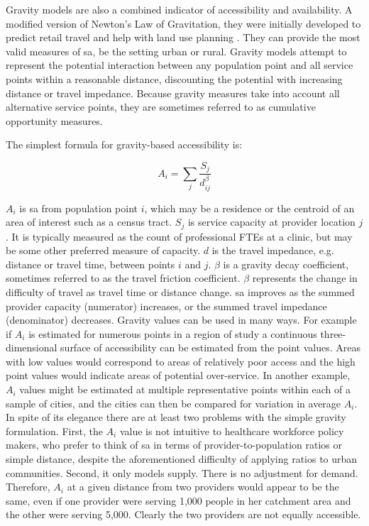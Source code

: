 Gravity models are also a combined indicator of accessibility and availability. A modified version of Newton's Law of Gravitation, they were initially developed to predict retail travel \cite{reilly_law_1931} and help with land use planning \cite{hansen_how_1959}. They can provide the most valid measures of \ac{sa}, be the setting urban or rural. Gravity models attempt to represent the potential interaction between any population point and all service points within a reasonable distance, discounting the potential with increasing distance or travel impedance. Because gravity measures take into account all alternative service points, they are sometimes referred to as cumulative opportunity measures.

The simplest formula for gravity-based accessibility is:

\begin{equation}
    A_i = \sum_j \frac{S_j}{d_{ij}^{\beta}}
\end{equation}

$A_i$ is \ac{sa} from population point $i$, which may be a residence or the centroid of an area of interest such as a census tract. $S_j$ is service capacity at provider location $j$. It is typically measured as the count of professional FTEs at a clinic, but may be some other preferred measure of capacity. $d$ is the travel impedance, e.g. distance or travel time, between points $i$ and $j$. $\beta$ is a gravity decay coefficient, sometimes referred to as the travel friction coefficient. $\beta$ represents the change in difficulty of travel as travel time or distance change. \ac{sa} improves as the summed provider capacity (numerator) increases, or the summed travel impedance (denominator) decreases. Gravity values can be used in many ways. For example if $A_i$ is estimated for numerous points in a region of study a continuous three-dimensional surface of accessibility can be estimated from the point values. Areas with low values would correspond to areas of relatively poor access and the high point values would indicate areas of potential over-service. In another example, $A_i$ values might be estimated at multiple representative points within each of a sample of cities, and the cities can then be compared for variation in average $A_i$. In spite of its elegance there are at least two problems with the simple gravity formulation. First, the $A_i$ value is not intuitive to healthcare workforce policy makers, who prefer to think of \ac{sa} in terms of provider-to-population ratios or simple distance, despite the aforementioned difficulty of applying ratios to urban communities. Second, it only models supply. There is no adjustment for demand. Therefore, $A_i$ at a given distance from two providers would appear to be the same, even if one provider were serving 1,000 people in her catchment area and the other were serving 5,000. Clearly the two providers are not equally accessible.

